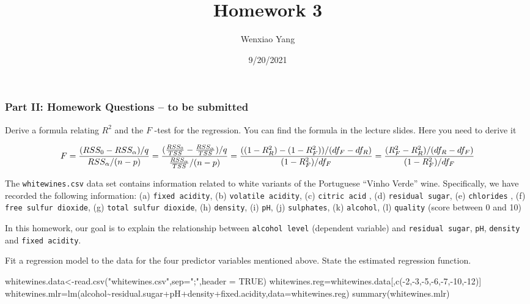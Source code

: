 \documentclass[
]{article}
\title{Homework 3}
\author{Wenxiao Yang}
\date{9/20/2021}
\newenvironment{Shaded}{\begin{snugshade}}{\end{snugshade}}
\newcommand{\AttributeTok}[1]{\textcolor[rgb]{0.77,0.63,0.00}{#1}}
\newcommand{\ConstantTok}[1]{\textcolor[rgb]{0.00,0.00,0.00}{#1}}
\newcommand{\DecValTok}[1]{\textcolor[rgb]{0.00,0.00,0.81}{#1}}
\newcommand{\FunctionTok}[1]{\textcolor[rgb]{0.00,0.00,0.00}{#1}}
\newcommand{\NormalTok}[1]{#1}
\newcommand{\OtherTok}[1]{\textcolor[rgb]{0.56,0.35,0.01}{#1}}
\newcommand{\SpecialCharTok}[1]{\textcolor[rgb]{0.00,0.00,0.00}{#1}}
\newcommand{\StringTok}[1]{\textcolor[rgb]{0.31,0.60,0.02}{#1}}
\begin{document}
\maketitle

\hypertarget{part-ii-homework-questions-to-be-submitted}{%
\subsubsection{Part II: Homework Questions -- to be
submitted}\label{part-ii-homework-questions-to-be-submitted}}

Derive a formula relating \(R^2\) and the \(F\) -test for the
regression. You can find the formula in the lecture slides. Here you
need to derive it

\[F=\frac{(RSS_{0}-RSS_{\alpha})/q}{RSS_{\alpha}/(n-p)}=\frac{(\frac{RSS_{0}}{TSS}-\frac{RSS_{\alpha}}{TSS})/q}{\frac{RSS_{\alpha}}{TSS}/(n-p)}\\=\frac{((1-R_R^2)-(1-R_F^2))/(df_F-df_R)}{(1-R_F^2)/df_F}=\frac{(R_F^2-R_R^2)/(df_R-df_F)}{(1-R_F^2)/df_F}\]

The \texttt{whitewines.csv} data set contains information related to
white variants of the Portuguese ``Vinho Verde'' wine. Specifically, we
have recorded the following information: (a) \texttt{fixed\ acidity},
(b) \texttt{volatile\ acidity}, (c) \texttt{citric\ acid} , (d)
\texttt{residual\ sugar}, (e) \texttt{chlorides} , (f)
\texttt{free\ sulfur\ dioxide}, (g) \texttt{total\ sulfur\ dioxide}, (h)
\texttt{density}, (i) \texttt{pH}, (j) \texttt{sulphates}, (k)
\texttt{alcohol}, (l) \texttt{quality} (score between 0 and 10)

In this homework, our goal is to explain the relationship between
\texttt{alcohol\ level} (dependent variable) and
\texttt{residual\ sugar}, \texttt{pH}, \texttt{density} and
\texttt{fixed\ acidity}.

Fit a regression model to the data for the four predictor variables
mentioned above. State the estimated regression function.

\begin{Shaded}
\begin{Highlighting}[]
\NormalTok{whitewines.data}\OtherTok{\textless{}{-}}\FunctionTok{read.csv}\NormalTok{(}\StringTok{"whitewines.csv"}\NormalTok{,}\AttributeTok{sep=}\StringTok{";"}\NormalTok{,}\AttributeTok{header =} \ConstantTok{TRUE}\NormalTok{)}
\NormalTok{whitewines.reg}\OtherTok{=}\NormalTok{whitewines.data[,}\FunctionTok{c}\NormalTok{(}\SpecialCharTok{{-}}\DecValTok{2}\NormalTok{,}\SpecialCharTok{{-}}\DecValTok{3}\NormalTok{,}\SpecialCharTok{{-}}\DecValTok{5}\NormalTok{,}\SpecialCharTok{{-}}\DecValTok{6}\NormalTok{,}\SpecialCharTok{{-}}\DecValTok{7}\NormalTok{,}\SpecialCharTok{{-}}\DecValTok{10}\NormalTok{,}\SpecialCharTok{{-}}\DecValTok{12}\NormalTok{)]}
\NormalTok{whitewines.mlr}\OtherTok{=}\FunctionTok{lm}\NormalTok{(alcohol}\SpecialCharTok{\textasciitilde{}}\NormalTok{residual.sugar}\SpecialCharTok{+}\NormalTok{pH}\SpecialCharTok{+}\NormalTok{density}\SpecialCharTok{+}\NormalTok{fixed.acidity,}\AttributeTok{data=}\NormalTok{whitewines.reg)}
\FunctionTok{summary}\NormalTok{(whitewines.mlr)}
\end{Highlighting}
\end{Shaded}
\end{document}
